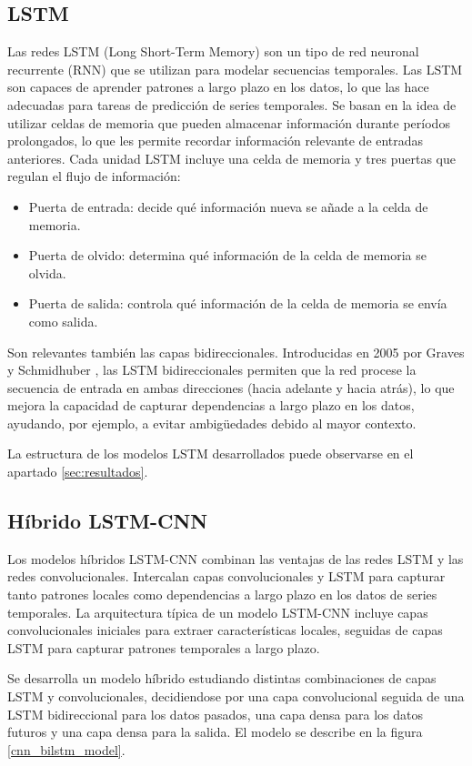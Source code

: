 \subsection{LSTM}
Las redes LSTM (Long Short-Term Memory) son un tipo de red neuronal recurrente (RNN) que se utilizan para modelar secuencias temporales.
Las LSTM son capaces de aprender patrones a largo plazo en los datos, lo que las hace adecuadas para tareas de predicción de series temporales.
Se basan en la idea de utilizar celdas de memoria que pueden almacenar información durante períodos prolongados, lo que les permite recordar información relevante de entradas anteriores.
Cada unidad LSTM incluye una celda de memoria y tres puertas que regulan el flujo de información:
\begin{itemize}
\item Puerta de entrada: decide qué información nueva se añade a la celda de memoria.
\item Puerta de olvido: determina qué información de la celda de memoria se olvida.
\item  Puerta de salida: controla qué información de la celda de memoria se envía como salida.
\end{itemize}

Son relevantes también las capas bidireccionales. Introducidas en 2005 por Graves y Schmidhuber \cite{graves_schmidhuber2005}, las LSTM bidireccionales permiten que la red procese la secuencia de 
entrada en ambas direcciones (hacia adelante y hacia atrás), lo que mejora la capacidad de capturar dependencias a largo plazo en los datos, ayudando, por ejemplo, a evitar
ambigüedades debido al mayor contexto.

La estructura de los modelos LSTM desarrollados puede observarse en el apartado \ref{sec:resultados}. 

\subsection{Híbrido LSTM-CNN}
Los modelos híbridos LSTM-CNN combinan las ventajas de las redes LSTM y las redes convolucionales. Intercalan capas convolucionales y LSTM para capturar tanto patrones locales como dependencias a largo plazo en los datos de series temporales.
La arquitectura típica de un modelo LSTM-CNN incluye capas convolucionales iniciales para extraer características locales, seguidas de capas LSTM para capturar patrones temporales a largo plazo.

Se desarrolla un modelo híbrido estudiando distintas combinaciones de capas LSTM y convolucionales, decidiendose por una capa convolucional seguida de una LSTM bidireccional para los datos pasados,
una capa densa para los datos futuros y una capa densa para la salida. El modelo se describe en la figura \ref{cnn_bilstm_model}.


